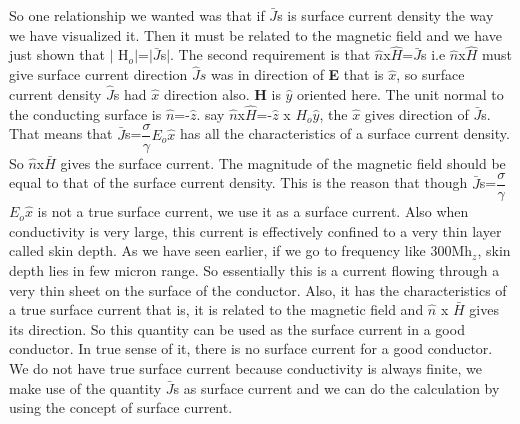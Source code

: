 So one relationship we wanted was that if $\bar{J}$s is surface current density the way we have visualized it. Then it must be related to the magnetic field and we have just shown that $\lvert$ H$_{o}$$\rvert$=$\rvert$$\bar{J}$s$\rvert$. The second requirement is that $\hat{n}$x$\hat{H}$=$\bar{J}$s i.e $\hat{n}$x$\hat{H}$  must give surface current direction $\hat{J}s$ was in direction of \textbf{E} that is $\hat{x}$, so surface current density $\hat{J}$s had $\hat{x}$ direction also. \textbf{H} is $\hat{y}$ oriented here. The unit normal to the conducting surface is $\hat{n}$=-$\hat{z}$. say $\hat{n}$x$\hat{H}$=-$\hat{z}$ x $H_{o}$$\hat{y}$, the $\hat{x}$ gives direction of $\bar{J}$s. That means that $\bar{J}$s=$\dfrac{\sigma}{\gamma}$$E_{o}$$\hat{x}$ has all the characteristics of a surface current density. So $\hat{n}$x$\bar{H}$ gives the surface current. The magnitude of the magnetic field should be equal to that of the surface current density. This is the reason that though $\bar{J}$s=$\dfrac{\sigma}{\gamma}$$E_{o}$$\hat{x}$ is not a true surface current, we use it as a surface current. Also when conductivity is very large, this current is effectively confined to a very thin layer called skin depth. As we have seen earlier, if we go to frequency like 300Mh$_{z}$, skin depth lies in few micron range. So essentially this is a current flowing through a very thin sheet on the surface of the conductor. Also, it has the characteristics of a true surface current that is, it is related to the magnetic field and $\hat{n}$ x $\bar{H}$ gives its direction. So this quantity can be used as the surface current in a good conductor. In true sense of it, there is no surface current for a good conductor. We do not have true surface current because conductivity is always finite, we make use of the quantity $\bar{J}$s as surface current and we can do the calculation by using the concept of surface current.

